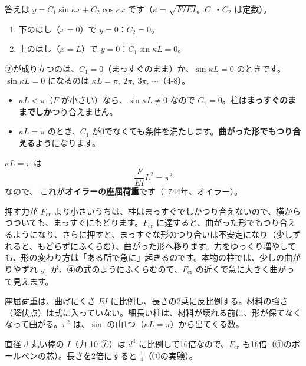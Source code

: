 答えは $y=C_1\sin\kappa x+C_2\cos\kappa x$ です（$\kappa=\sqrt{F/EI}$。$C_1$・$C_2$ は定数）。
\begin{enumerate}[label={\bkcircled{\arabic*}}, leftmargin=2.2\zw, itemsep=2pt, topsep=2pt]
\item 下のはし（$x=0$）で $y=0$：$C_2=0$。
\item 上のはし（$x=L$）で $y=0$：$C_1\sin \kappa L=0$。
\end{enumerate}
②が成り立つのは、$C_1=0$（まっすぐのまま）か、$\sin \kappa L=0$ のときです。$\sin \kappa L=0$ になるのは $\kappa L=\pi,\ 2\pi,\ 3\pi,\ \cdots$（4-8）。
\begin{itemize}[leftmargin=1.2\zw, itemsep=2pt, topsep=2pt, label={\color{bkTheme}●}]
\item $\kappa L<\pi$（$F$ が小さい）なら、$\sin \kappa L\neq0$ なので $C_1=0$。柱は\textbf{まっすぐのままでしか}つり合えません。
\item $\kappa L=\pi$ のとき、$C_1$ が0でなくても条件を満たします。\textbf{曲がった形でもつり合える}ようになります。
\end{itemize}
$\kappa L=\pi$ は
\[\frac{F}{EI}L^2=\pi^2\]
なので、
\label{ph:力-11:euler}
これが\textbf{オイラーの座屈荷重}です（1744年、オイラー）。

押す力が $F_{\mathrm{cr}}$ より小さいうちは、柱はまっすぐでしかつり合えないので、横からつついても、まっすぐにもどります。$F_{\mathrm{cr}}$ に達すると、曲がった形でもつり合えるようになり、さらに押すと、まっすぐな形のつり合いは不安定になり（少しずれると、もどらずにふくらむ）、曲がった形へ移ります。力をゆっくり増やしても、形の変わり方は「ある所で急に」起きるのです。本物の柱では、少しの曲がりやずれ $y_0$ が、④の式のようにふくらむので、$F_{\mathrm{cr}}$ の近くで急に大きく曲がって見えます。

\begin{phyomi}[$F_{\mathrm{cr}}=\dfrac{\pi^2EI}{L^2}$]
座屈荷重は、曲げにくさ $EI$ に比例し、長さの2乗に反比例する。材料の強さ（降伏点）は式に入っていない。細長い柱は、材料が壊れる前に、形が保てなくなって曲がる。$\pi^2$ は、$\sin$ の山1つ（$\kappa L=\pi$）から出てくる数。
\end{phyomi}
\begin{phbaisuru}{直径 $d$}
丸い棒の $I$（力-10 ⑦）は $d^4$ に比例して16倍なので、$F_{\mathrm{cr}}$ も16倍（①のボールペンの芯）。長さを2倍にすると $\tfrac{1}{4}$（①の実験）。
\end{phbaisuru}

